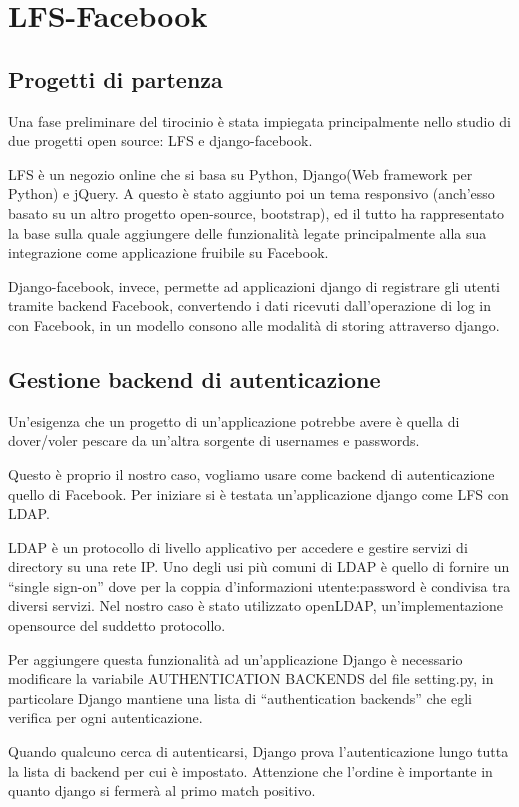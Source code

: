 \chapter{LFS-Facebook}

\section{Progetti di partenza}
Una fase preliminare del tirocinio è stata impiegata principalmente nello studio di due progetti open source: LFS e django-facebook.

LFS è un negozio online che  si basa su Python, Django(Web framework per Python) e jQuery. A questo è stato aggiunto poi un tema responsivo (anch'esso basato su un altro progetto open-source, bootstrap), ed il tutto ha rappresentato la base sulla quale aggiungere delle funzionalità legate principalmente alla sua integrazione come applicazione fruibile su Facebook. 

Django-facebook, invece, permette ad applicazioni django di registrare gli utenti tramite backend Facebook, convertendo i dati ricevuti dall'operazione di log in con Facebook, in un modello consono alle modalità di storing attraverso django.

\section{Gestione backend di autenticazione}
Un'esigenza che un progetto di un'applicazione potrebbe avere è quella di dover/voler pescare da un'altra sorgente di usernames e passwords.

Questo è proprio il nostro caso, vogliamo usare come backend di autenticazione quello di Facebook.
Per iniziare si è testata un'applicazione django come LFS con LDAP. 

LDAP è un protocollo di livello applicativo per accedere e gestire servizi di directory su una rete IP. Uno degli usi più comuni di LDAP è quello di fornire un “single sign-on” dove per la coppia d'informazioni utente:password è condivisa tra diversi servizi.
Nel nostro caso è stato utilizzato openLDAP, un'implementazione opensource del suddetto protocollo.

Per aggiungere questa funzionalità ad un'applicazione Django è necessario modificare la variabile AUTHENTICATION BACKENDS del file setting.py, in particolare Django mantiene una lista di “authentication backends” che egli verifica per ogni autenticazione. 

Quando qualcuno cerca di autenticarsi, Django prova l'autenticazione lungo tutta la lista di backend per cui è impostato. 
Attenzione che l'ordine è importante in quanto django si fermerà al primo match positivo.

